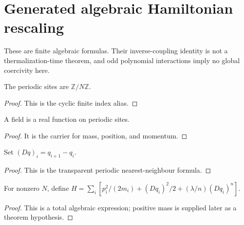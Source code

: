 
\chapter{Generated algebraic Hamiltonian rescaling}
\label{ch:ArchonPhysics_Generated_problem_hamiltonian_scaling}

These are finite algebraic formulas. Their inverse-coupling identity is not a thermalization-time theorem, and odd polynomial interactions imply no global coercivity here.

\begin{definition}
\label{def:scaling:site}
The periodic sites are $\mathbb Z/N\mathbb Z$.
\end{definition}
\begin{proof}This is the cyclic finite index alias.\end{proof}

\begin{definition}
\label{def:scaling:field}
A field is a real function on periodic sites.
\end{definition}
\begin{proof}It is the carrier for mass, position, and momentum.\end{proof}

\begin{definition}
\label{def:scaling:forward-difference}
Set $(Dq)_i=q_{i+1}-q_i$.
\end{definition}
\begin{proof}This is the transparent periodic nearest-neighbour formula.\end{proof}

\begin{definition}
\label{def:scaling:hamiltonian}
For nonzero $N$, define $H=\sum_i[p_i^2/(2m_i)+(Dq_i)^2/2+(\lambda/n)(Dq_i)^n]$.
\end{definition}
\begin{proof}This is a total algebraic expression; positive mass is supplied later as a theorem hypothesis.\end{proof}

